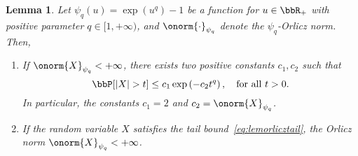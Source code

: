 \documentclass[11pt]{article}
\newcommand{\of}[1]{\left(#1\right)}
\theoremstyle{plain}
\newtheorem{lem}{Lemma}
\theoremstyle{definition}
\begin{document}
    \begin{lem}
    Let $\psi_q(u) = \exp(u^q) - 1$ be a function for $u \in \bbR_+$ with positive parameter $q \in [1,+\infty)$, and $\onorm{\cdot}_{\psi_q}$ denote the $\psi_q$-Orlicz norm. Then,
    \begin{enumerate}
    	\item[(a.)] If $\onorm{X}_{\psi_q} < +\infty$, there exists two positive constants $c_1,c_2$ such that
    	\begin{equation}\label{eq:lemorlicztail}
    		\bbP[|X| > t] \leq c_1 \exp \of{-c_2 t^q},\quad \text{for all } t > 0.
    	\end{equation}
    	In particular, the constants $c_1 = 2$ and $c_2 = \onorm{X}_{\psi_q}$.
    	
    	\item[(b.)] If the random variable $X$ satisfies the tail bound~\eqref{eq:lemorlicztail}, the Orlicz norm $\onorm{X}_{\psi_q} < +\infty$.
    \end{enumerate}
    \end{lem}
\end{document}
